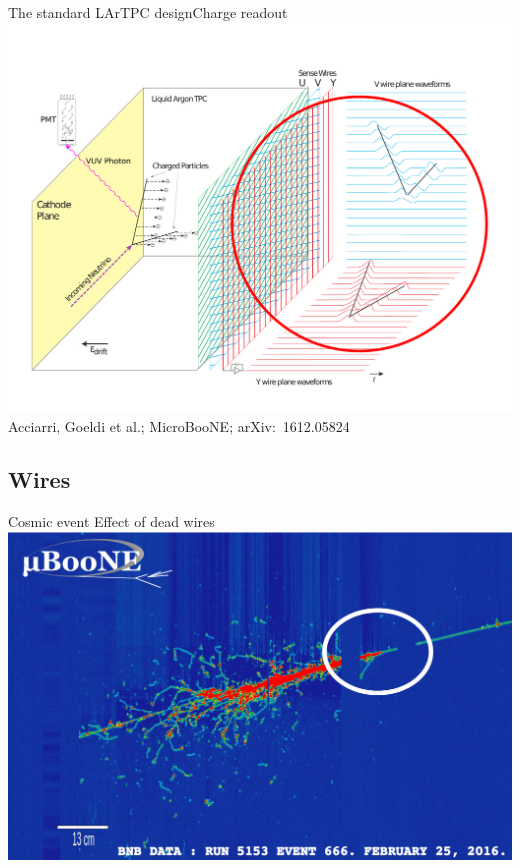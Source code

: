 \documentclass[]{beamer}
\newcommand*{\emphcoltitle}{blue}
\newcommand*{\uboone}{{MicroBooNE}}
\newcommand*{\lartpc}{{LArTPC}}
\begin{document}
\begin{frame}{The standard \lartpc{} design}{Charge readout}
	\centering
	\includegraphics[viewport=35 40 755 540, clip, height=.66\textheight]{defence/TPCprinciple_charge-ro}\\
	{\tiny Acciarri, Goeldi et al.; \uboone{}; arXiv:~1612.05824~\cite{uboone}}
\end{frame}

\subsection{Wires}

\begin{frame}{Cosmic event}{\color{\emphcoltitle} Effect of dead wires}
	\centering
	\includegraphics[height=.8\textheight]{defence/uboone_em-shower_dead-wires}
\end{frame}
\end{document}
